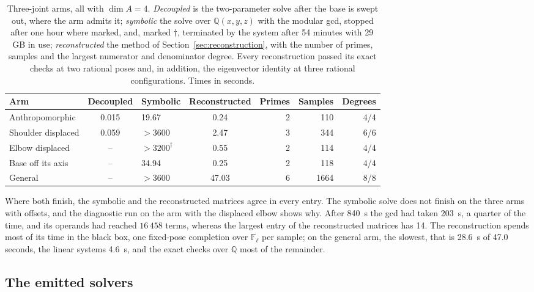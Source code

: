 \documentclass[11pt,a4paper]{article}
\theoremstyle{plain}
\theoremstyle{definition}
\theoremstyle{remark}
\newcommand{\FF}{\mathbb{F}}
\newcommand{\QQ}{\mathbb{Q}}
\begin{document}
\begin{table}[htbp]
\centering
\caption{Three-joint arms, all with $\dim A = 4$. \emph{Decoupled} is the two-parameter solve after the
base is swept out, where the arm admits it; \emph{symbolic} the solve over $\QQ(x,y,z)$ with the
modular gcd, stopped after one hour where marked, and, marked $\dagger$, terminated by the system after
54 minutes with 29\,GB in use; \emph{reconstructed} the method of
Section~\ref{sec:reconstruction}, with the number of primes, samples and the largest numerator and
denominator degree. Every reconstruction passed its exact checks at two rational poses and, in
addition, the eigenvector identity at three rational configurations. Times in seconds.}
\label{tab:arms}
\small
\begin{tabular}{lS[table-format=1.3]lS[table-format=2.2]rrr}
\toprule
Arm & {Decoupled} & Symbolic & {Reconstructed} & Primes & Samples & Degrees \\
\midrule
Anthropomorphic & 0.015 & 19.67 & 0.24 & 2 & 110 & 4/4 \\
Shoulder displaced & 0.059 & $>3600$ & 2.47 & 3 & 344 & 6/6 \\
Elbow displaced & {--} & $>3200^{\dagger}$ & 0.55 & 2 & 114 & 4/4 \\
Base off its axis & {--} & 34.94 & 0.25 & 2 & 118 & 4/4 \\
General & {--} & $>3600$ & 47.03 & 6 & 1664 & 8/8 \\
\bottomrule
\end{tabular}
\end{table}

Where both finish, the symbolic and the reconstructed matrices agree in every entry. The symbolic
solve does not finish on the three arms with offsets, and the diagnostic run on the arm with the
displaced elbow shows why. After \SI{840}{\second} the gcd had taken \SI{203}{\second}, a quarter of
the time, and its operands had reached $16\,458$ terms, whereas the largest entry of the reconstructed
matrices has 14. The reconstruction spends most of its time in the black box, one
fixed-pose completion over $\FF_\ell$ per sample; on the general arm, the slowest, that is \SI{28.6}{\second}
of 47.0 seconds, the linear systems \SI{4.6}{\second}, and the exact checks over $\QQ$ most of the
remainder.

\subsection{The emitted solvers}
\end{document}
